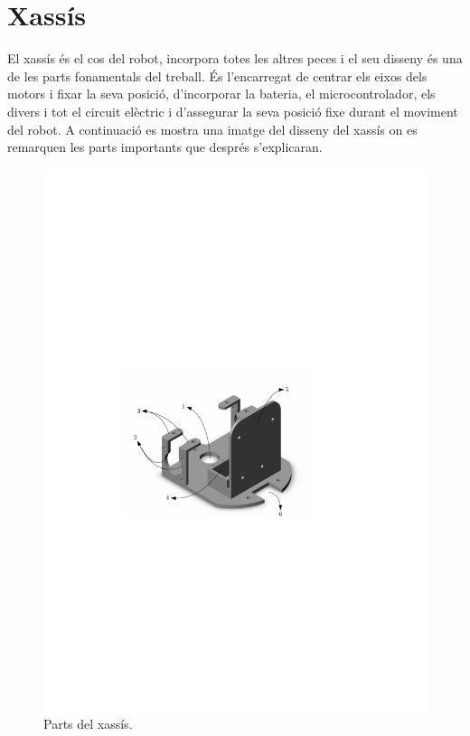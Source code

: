 \section{Xassís}

El xassís és el cos del robot, incorpora totes les altres peces i el seu disseny és una de les parts fonamentals del treball. És l’encarregat de centrar els eixos dels motors i fixar la seva posició, d’incorporar la bateria, el microcontrolador, els divers i tot el circuit elèctric i d'assegurar la seva posició fixe durant el moviment del robot. A continuació es mostra una imatge del disseny del xassís on es remarquen les parts importants que després s'explicaran. 

\begin{figure}[H]
	\centering
	\includegraphics{xassis}
	\caption{Parts del xassís.}
	\label{fig:xassis}
\end{figure}
 
